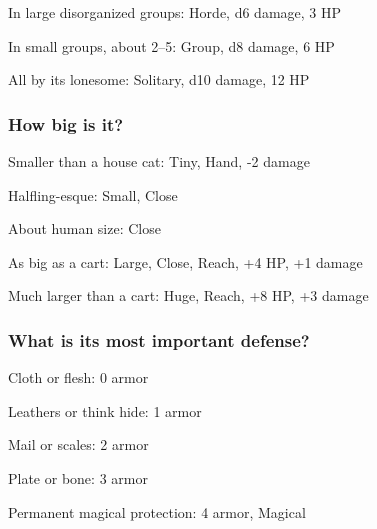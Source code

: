 \startitemize[1,packed]
         
\item In large disorganized groups: Horde, d6 damage, 3 HP

         
\item In small groups, about 2–5: Group, d8 damage, 6 HP

         
\item All by its lonesome: Solitary, d10 damage, 12 HP

       
\stopitemize
       
\subsubsection{How big is it?}   
       
\startitemize[1,packed]
         
\item Smaller than a house cat: Tiny, Hand, -2 damage

         
\item Halfling-esque: Small, Close

         
\item About human size: Close

         
\item As big as a cart: Large, Close, Reach, +4 HP, +1 damage

         
\item Much larger than a cart: Huge, Reach, +8 HP, +3 damage

       
\stopitemize
       
\subsubsection{What is its most important defense?}    
       
\startitemize[1,packed]
         
\item Cloth or flesh: 0 armor

         
\item Leathers or think hide: 1 armor

         
\item Mail or scales: 2 armor

         
\item Plate or bone: 3 armor

         
\item Permanent magical protection: 4 armor, Magical

